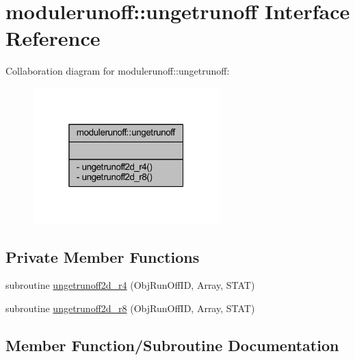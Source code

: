 \hypertarget{interfacemodulerunoff_1_1ungetrunoff}{}\section{modulerunoff\+:\+:ungetrunoff Interface Reference}
\label{interfacemodulerunoff_1_1ungetrunoff}


Collaboration diagram for modulerunoff\+:\+:ungetrunoff\+:\nopagebreak
\begin{figure}[H]
\begin{center}
\leavevmode
\includegraphics[width=205pt]{interfacemodulerunoff_1_1ungetrunoff__coll__graph}
\end{center}
\end{figure}
\subsection*{Private Member Functions}
\begin{DoxyCompactItemize}
\item 
subroutine \mbox{\hyperlink{interfacemodulerunoff_1_1ungetrunoff_ad8b19393f91fad3b63bbf817a156c8f8}{ungetrunoff2d\+\_\+r4}} (Obj\+Run\+Off\+ID, Array, S\+T\+AT)
\item 
subroutine \mbox{\hyperlink{interfacemodulerunoff_1_1ungetrunoff_ad30fb1766888572f8c792b40853b2b30}{ungetrunoff2d\+\_\+r8}} (Obj\+Run\+Off\+ID, Array, S\+T\+AT)
\end{DoxyCompactItemize}


\subsection{Member Function/\+Subroutine Documentation}
\mbox{\label{interfacemodulerunoff_1_1ungetrunoff_ad8b19393f91fad3b63bbf817a156c8f8}} 
